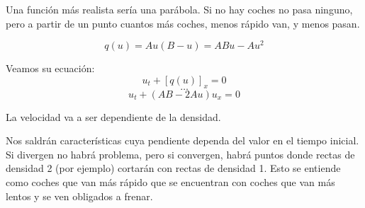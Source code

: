 		Una función más realista sería una parábola. Si no hay coches no pasa ninguno, pero a partir de un punto cuantos más coches, menos rápido van, y menos pasan.

		$$ q(u) = Au (B-u) = ABu - Au^{2} $$

		Veamos su ecuación:
		$$u_t + [q(u)]_x = 0$$
		$$ … $$
		$$ u_t + (AB - 2Au) u_x = 0 $$

		La velocidad va a ser dependiente de la densidad.

		Nos saldrán características cuya pendiente dependa del valor en el tiempo inicial. Si divergen no habrá problema, pero si convergen, habrá puntos donde rectas de densidad 2 (por ejemplo) cortarán con rectas de densidad 1. Esto se entiende como coches que van más rápido que se encuentran con coches que van más lentos y se ven obligados a frenar.


